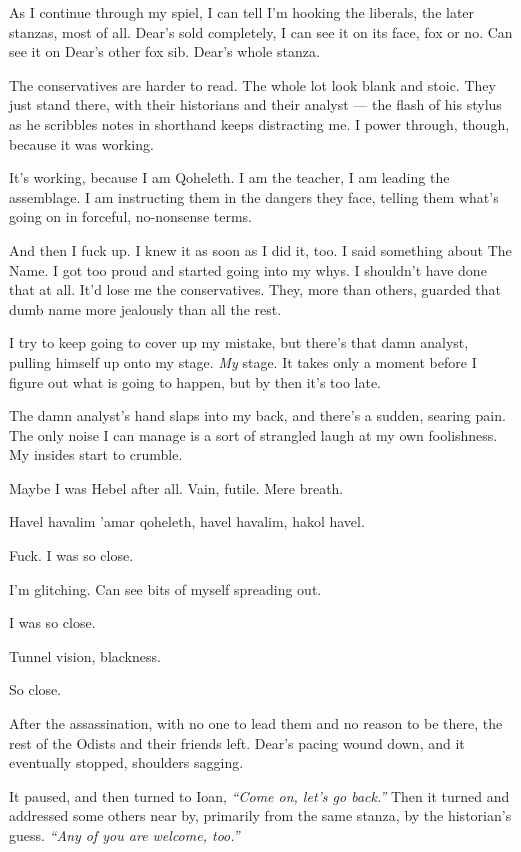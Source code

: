 As I continue through my spiel, I can tell I'm hooking the liberals, the later stanzas, most of all. Dear's sold completely, I can see it on its face, fox or no. Can see it on Dear's other fox sib. Dear's whole stanza.

The conservatives are harder to read. The whole lot look blank and stoic. They just stand there, with their historians and their analyst --- the flash of his stylus as he scribbles notes in shorthand keeps distracting me. I power through, though, because it was working.

It's working, because I am Qoheleth. I am the teacher, I am leading the assemblage. I am instructing them in the dangers they face, telling them what's going on in forceful, no-nonsense terms.

And then I fuck up. I knew it as soon as I did it, too. I said something about The Name. I got too proud and started going into my whys. I shouldn't have done that at all. It'd lose me the conservatives. They, more than others, guarded that dumb name more jealously than all the rest.

I try to keep going to cover up my mistake, but there's that damn analyst, pulling himself up onto my stage. \emph{My} stage. It takes only a moment before I figure out what is going to happen, but by then it's too late.

The damn analyst's hand slaps into my back, and there's a sudden, searing pain. The only noise I can manage is a sort of strangled laugh at my own foolishness. My insides start to crumble.

Maybe I was Hebel after all. Vain, futile. Mere breath.

Havel havalim 'amar qoheleth, havel havalim, hakol havel.

Fuck. I was so close.

I'm glitching. Can see bits of myself spreading out.

I was so close.

Tunnel vision, blackness.

So close.

\secdiv{}

\noindent After the assassination, with no one to lead them and no reason to be there, the rest of the Odists and their friends left. Dear's pacing wound down, and it eventually stopped, shoulders sagging.

It paused, and then turned to Ioan, \emph{``Come on, let's go back.''} Then it turned and addressed some others near by, primarily from the same stanza, by the historian's guess. \emph{``Any of you are welcome, too.''}

